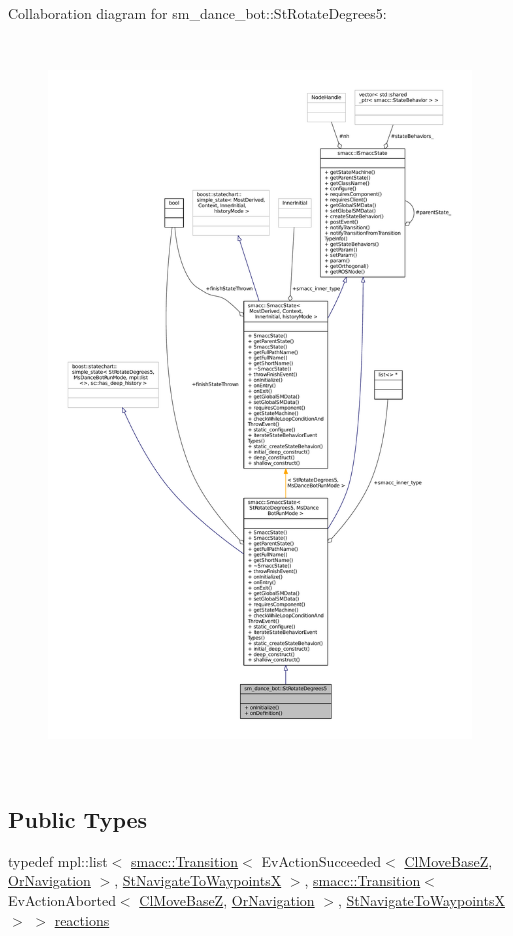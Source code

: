 Collaboration diagram for sm\+\_\+dance\+\_\+bot\+:\+:St\+Rotate\+Degrees5\+:
\nopagebreak
\begin{figure}[H]
\begin{center}
\leavevmode
\includegraphics[height=550pt]{structsm__dance__bot_1_1StRotateDegrees5__coll__graph}
\end{center}
\end{figure}
\subsection*{Public Types}
\begin{DoxyCompactItemize}
\item 
typedef mpl\+::list$<$ \hyperlink{classsmacc_1_1Transition}{smacc\+::\+Transition}$<$ Ev\+Action\+Succeeded$<$ \hyperlink{classmove__base__z__client_1_1ClMoveBaseZ}{Cl\+Move\+BaseZ}, \hyperlink{classsm__dance__bot_1_1OrNavigation}{Or\+Navigation} $>$, \hyperlink{structsm__dance__bot_1_1StNavigateToWaypointsX}{St\+Navigate\+To\+WaypointsX} $>$, \hyperlink{classsmacc_1_1Transition}{smacc\+::\+Transition}$<$ Ev\+Action\+Aborted$<$ \hyperlink{classmove__base__z__client_1_1ClMoveBaseZ}{Cl\+Move\+BaseZ}, \hyperlink{classsm__dance__bot_1_1OrNavigation}{Or\+Navigation} $>$, \hyperlink{structsm__dance__bot_1_1StNavigateToWaypointsX}{St\+Navigate\+To\+WaypointsX} $>$ $>$ \hyperlink{structsm__dance__bot_1_1StRotateDegrees5_a2b26d5bf7b16e986db05aa5b64d5e88d}{reactions}
\end{DoxyCompactItemize}
